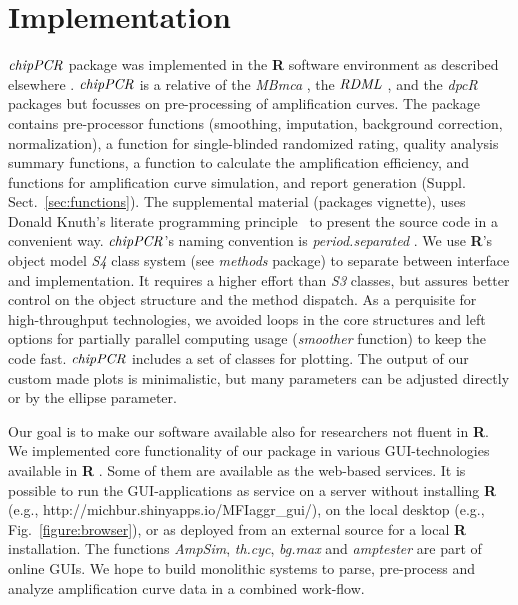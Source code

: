 \documentclass{bioinfo}
\begin{document}
\section{Implementation}
\begin{methods}

$\emph{chipPCR}$ package was implemented in the \textbf{R} software environment 
as described elsewhere \citep{RCT_2013,rodiger_rkward_2012}. $\emph{chipPCR}$ is 
a relative of the \emph{MBmca} \citep{roediger_RJ_2013}, the $\emph{RDML}$  
\citep{blagodatskikh_2014}, and the \emph{dpcR} \citep{pabinger_2014} packages 
but focusses on pre-processing of amplification curves. The package contains 
pre-processor functions (smoothing, imputation, background correction, 
normalization), a function for single-blinded randomized rating, quality 
analysis summary functions, a function to calculate the amplification 
efficiency, and functions for amplification curve simulation, and report 
generation (Suppl. Sect.~\ref{sec:functions}). The supplemental material 
(packages vignette), uses Donald Knuth's literate programming 
principle~\citep{Knuth1984} to present the source code in a convenient way. 
$\emph{chipPCR}$'s naming convention is \textit{period.separated} 
\citep{Baaaath_2012}. We use \textbf{R}'s object model \emph{S4} class system 
(see \emph{methods} package) to separate between interface and implementation. 
It requires a higher effort than \emph{S3} classes, but assures better control 
on the object structure and the method dispatch. As a perquisite for 
high-throughput technologies, we avoided loops in the core structures and left 
options for partially parallel computing usage (\textsl{smoother} function) to 
keep the code fast. $\emph{chipPCR}$ includes a set of classes for plotting. The 
output of our custom made plots is minimalistic, but many parameters can be 
adjusted directly or by the ellipse parameter.

Our goal is to make our software available also for researchers not fluent in 
\textbf{R}. We implemented core functionality of our package in various 
GUI-technologies available in \textbf{R} \citep{rodiger_rkward_2012, 
shiny_2014}. Some of them are available as the web-based services. It is 
possible to run the GUI-applications as service on a server without installing 
\textbf{R} (e.g., http://michbur.shinyapps.io/MFIaggr\_gui/), on the local 
desktop (e.g., Fig.~\ref{figure:browser}), or as deployed from an external 
source for a local \textbf{R} installation. The functions \textsl{AmpSim}, 
\textsl{th.cyc}, \textsl{bg.max} and \textsl{amptester} are part of online GUIs. 
We hope to build monolithic systems to parse, pre-process and analyze 
amplification curve data in a combined work-flow. 


\end{methods}
\end{document}
